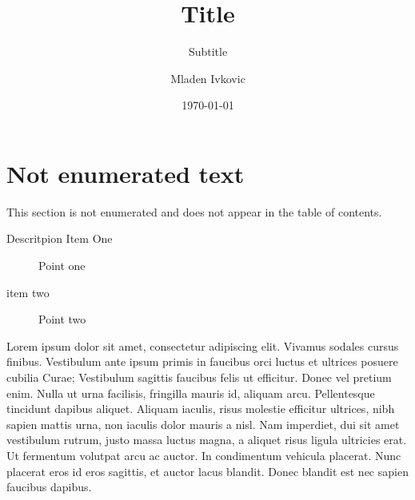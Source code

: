 




\title{Title}
\subtitle{Subtitle}
\author{Mladen Ivkovic}
\date{\today}
















	
\nocite{*} %




	


\maketitle
\clearpage










\section*{Not enumerated text}
This section is not enumerated and does not appear in the table of contents.
\begin{description}
	\item[Descritpion Item One] Point one
	\item[item two] Point two
\end{description}


Lorem ipsum dolor sit amet, consectetur adipiscing elit. Vivamus sodales cursus finibus. Vestibulum ante ipsum primis in faucibus orci luctus et ultrices posuere cubilia Curae; Vestibulum sagittis faucibus felis ut efficitur. Donec vel pretium enim. Nulla ut urna facilisis, fringilla mauris id, aliquam arcu. Pellentesque tincidunt dapibus aliquet. Aliquam iaculis, risus molestie efficitur ultrices, nibh sapien mattis urna, non iaculis dolor mauris a nisl. Nam imperdiet, dui sit amet vestibulum rutrum, justo massa luctus magna, a aliquet risus ligula ultricies erat. Ut fermentum volutpat arcu ac auctor. In condimentum vehicula placerat. Nunc placerat eros id eros sagittis, et auctor lacus blandit. Donec blandit est nec sapien faucibus dapibus.

